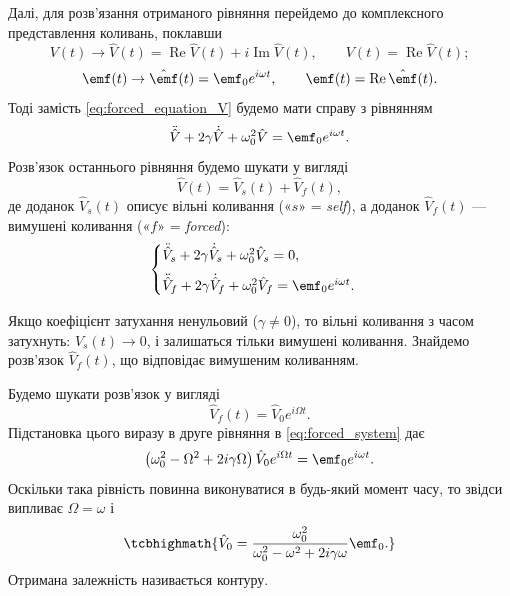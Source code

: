 Далі, для розв'язання отриманого рівняння перейдемо до комплексного
представлення коливань, поклавши
\begin{equation}\label{eq:complex_representation}
	V(t) \to \hat{V}(t) = \operatorname{Re}\hat{V}(t) + i\operatorname{Im}\hat{V}(t), \qquad
	V(t) = \operatorname{Re}\hat{V}(t);
\end{equation}
\begin{equation}\label{eq:complex_EMF}
	\emf(t) \to \hat{\emf}(t) = \emf_0 e^{i\omega t}, \qquad
	\emf(t) = \operatorname{Re}\hat{\emf}(t).
\end{equation}
Тоді замість \eqref{eq:forced_equation_V} будемо мати справу з рівнянням
\begin{equation}\label{eq:complex_forced}
	\ddot{\hat{V}} + 2\gamma\dot{\hat{V}} + \omega_0^2 \hat{V} = \emf_0 e^{i\omega t}.
\end{equation}
Розв'язок останнього рівняння будемо шукати у вигляді
\begin{equation}\label{eq:solution_decomposition}
	\hat{V}(t) = \hat{V}_s(t) + \hat{V}_f(t),
\end{equation}
де доданок $\hat{V}_s(t)$ описує вільні коливання («$s$» = \emph{self}), а доданок $\hat{V}_f(t)$ --- вимушені коливання («$f$» = \emph{forced}):
\begin{equation}\label{eq:forced_system}
	\begin{cases}
		\ddot{\hat{V}}_s + 2\gamma\dot{\hat{V}}_s + \omega_0^2 \hat{V}_s = 0, \\[6pt]
		\ddot{\hat{V}}_f + 2\gamma\dot{\hat{V}}_f + \omega_0^2 \hat{V}_f = \emf_0 e^{i\omega t}.
	\end{cases}
\end{equation}

Якщо коефіцієнт затухання ненульовий ($\gamma \neq 0$), то вільні коливання з часом затухнуть: $V_s(t) \to 0$, і залишаться тільки вимушені
коливання. Знайдемо розв'язок $\hat{V}_f(t)$, що відповідає вимушеним коливанням.

Будемо шукати розв'язок у вигляді
\begin{equation}\label{eq:ansatz_forced}
	\hat{V}_f(t) = \hat{V}_0 e^{i\Omega t}.
\end{equation}
Підстановка цього виразу в друге рівняння в \eqref{eq:forced_system} дає
\begin{equation}\label{eq:substitution_forced}
	\left(\omega_0^2 - \Omega^2 + 2i\gamma\Omega\right)\hat{V}_0 e^{i\Omega t} = \emf_0 e^{i\omega t}.
\end{equation}
Оскільки така рівність повинна виконуватися в будь-який момент часу, то звідси випливає $\Omega = \omega$ і
\begin{equation}\label{eq:V0_frequency_response}
	\tcbhighmath{
		\hat{V}_0 = \frac{\omega_0^2}{\omega_0^2 - \omega^2 + 2i\gamma\omega}\emf_0.
	}
\end{equation}
Отримана залежність називається  контуру.

